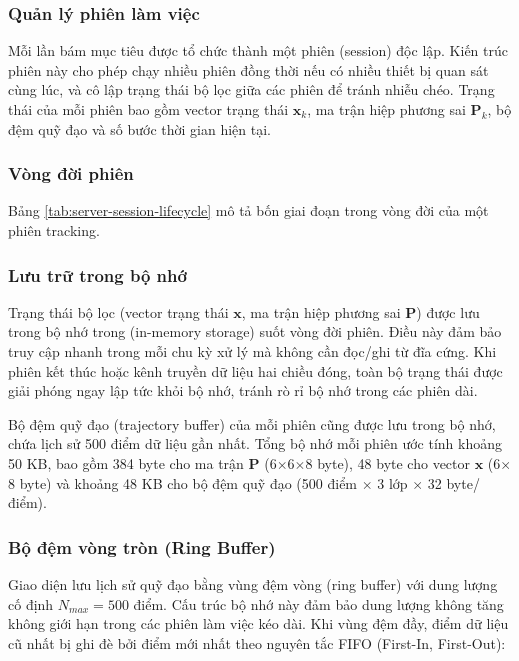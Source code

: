 \subsubsection{Quản lý phiên làm việc}

\hspace{0.5cm} Mỗi lần bám mục tiêu được tổ chức thành một phiên (session) độc lập. Kiến trúc phiên này cho phép chạy nhiều phiên đồng thời nếu có nhiều thiết bị quan sát cùng lúc, và cô lập trạng thái bộ lọc giữa các phiên để tránh nhiễu chéo. Trạng thái của mỗi phiên bao gồm vector trạng thái $\mathbf{x}_k$, ma trận hiệp phương sai $\mathbf{P}_k$, bộ đệm quỹ đạo và số bước thời gian hiện tại.

\subsubsection{Vòng đời phiên}

\hspace{0.5cm} Bảng \ref{tab:server-session-lifecycle} mô tả bốn giai đoạn trong vòng đời của một phiên tracking.

\subsubsection{Lưu trữ trong bộ nhớ}

\hspace{0.5cm} Trạng thái bộ lọc (vector trạng thái $\mathbf{x}$, ma trận hiệp phương sai $\mathbf{P}$) được lưu trong bộ nhớ trong (in-memory storage) suốt vòng đời phiên. Điều này đảm bảo truy cập nhanh trong mỗi chu kỳ xử lý mà không cần đọc/ghi từ đĩa cứng. Khi phiên kết thúc hoặc kênh truyền dữ liệu hai chiều đóng, toàn bộ trạng thái được giải phóng ngay lập tức khỏi bộ nhớ, tránh rò rỉ bộ nhớ trong các phiên dài.

Bộ đệm quỹ đạo (trajectory buffer) của mỗi phiên cũng được lưu trong bộ nhớ, chứa lịch sử 500 điểm dữ liệu gần nhất. Tổng bộ nhớ mỗi phiên ước tính khoảng 50 KB, bao gồm 384 byte cho ma trận $\mathbf{P}$ (6$\times$6$\times$8 byte), 48 byte cho vector $\mathbf{x}$ (6$\times$8 byte) và khoảng 48 KB cho bộ đệm quỹ đạo (500 điểm $\times$ 3 lớp $\times$ 32 byte/điểm).

\subsubsection{Bộ đệm vòng tròn (Ring Buffer)}

\hspace{0.5cm} Giao diện lưu lịch sử quỹ đạo bằng vùng đệm vòng (ring buffer) với dung lượng cố định $N_{max} = 500$ điểm. Cấu trúc bộ nhớ này đảm bảo dung lượng không tăng không giới hạn trong các phiên làm việc kéo dài. Khi vùng đệm đầy, điểm dữ liệu cũ nhất bị ghi đè bởi điểm mới nhất theo nguyên tắc FIFO (First-In, First-Out):


